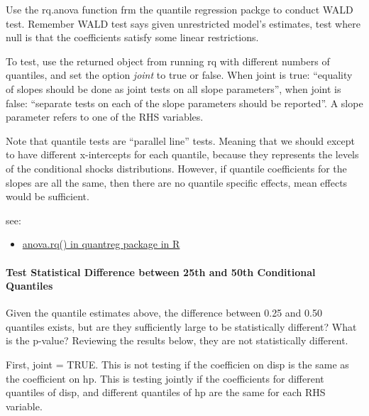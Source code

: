 \documentclass[
]{book}
\providecommand{\tightlist}{%
  \setlength{\itemsep}{0pt}\setlength{\parskip}{0pt}}
\begin{document}
Use the rq.anova function frm the quantile regression packge to conduct WALD test. Remember WALD test says given unrestricted model's estimates, test where null is that the coefficients satisfy some linear restrictions.

To test, use the returned object from running rq with different numbers of quantiles, and set the option \emph{joint} to true or false. When joint is true: ``equality of slopes should be done as joint tests on all slope parameters'', when joint is false: ``separate tests on each of the slope parameters should be reported''. A slope parameter refers to one of the RHS variables.

Note that quantile tests are ``parallel line'' tests. Meaning that we should except to have different x-intercepts for each quantile, because they represents the levels of the conditional shocks distributions. However, if quantile coefficients for the slopes are all the same, then there are no quantile specific effects, mean effects would be sufficient.

see:

\begin{itemize}
\tightlist
\item
  \href{https://stackoverflow.com/questions/32743758/anova-rq-in-quantreg-package-in-r}{anova.rq() in quantreg package in R}
\end{itemize}

\hypertarget{test-statistical-difference-between-25th-and-50th-conditional-quantiles}{%
\paragraph{Test Statistical Difference between 25th and 50th Conditional Quantiles}\label{test-statistical-difference-between-25th-and-50th-conditional-quantiles}}

Given the quantile estimates above, the difference between 0.25 and 0.50 quantiles exists, but are they sufficiently large to be statistically different? What is the p-value? Reviewing the results below, they are not statistically different.

First, joint = TRUE. This is not testing if the coefficien on disp is the same as the coefficient on hp. This is testing jointly if the coefficients for different quantiles of disp, and different quantiles of hp are the same for each RHS variable.
\end{document}

